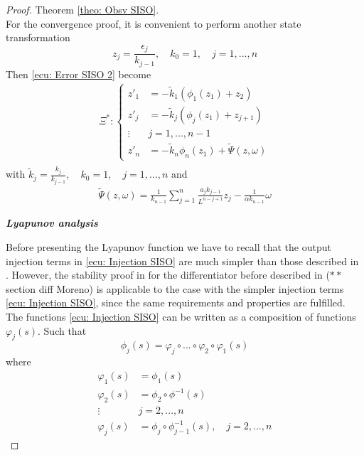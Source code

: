 \documentclass[11pt,letterpaper,twoside,openright]{report}
\begin{document}
\begin{proof}{Theorem \ref{theo: Obsv SISO}. \\}
	For the convergence proof, it is convenient to perform another state transformation
	\begin{equation}
			z_{j} = \frac{\epsilon_{j}}{k_{j-1}},\quad k_0=1,\quad j=1,...,n
	\end{equation}
	Then \eqref{ecu: Error SISO 2} become
	\begin{equation}
		\begin{split}\label{ed2}
			\Xi^*: \left\{
			\begin{array}{rl}
				z'_{1} &= -\tilde{k}_{1}\left( \phi_{1}( z_{1} ) + z_{2} \right)  \\
				z'_{j} &= -\tilde{k}_{j}\left( \phi_{j}( z_{1} ) + z_{j+1} \right)  \\
				\vdots \quad & j=1,...,n-1\\
				z'_{n} &= -\tilde{k}_{n} \phi_{n}( z_{1} ) + \tilde{\Psi}(z,\omega)
			\end{array}
			\right. \\
		\end{split}
	\end{equation}
	with $\tilde{k}_{j}=\frac{k_{j}}{k_{j-1}}, \quad k_{0} = 1, \quad j=1,...,n$ and
	\begin{equation}\label{ecu: tilde Psi}
		\begin{split}
			\tilde{\Psi}(z,\omega) = \frac{1}{k_{n-1}} \sum_{j=1}^{n}  \frac{a_{j}k_{j-1}}{L^{n-j+1}} z_{j} - \frac{1}{\alpha k_{n-1}}\omega
		\end{split} 
	\end{equation}

	\textbf{\textit{Lyapunov analysis}}
	
	Before presenting the Lyapunov function we have to recall that the output injection terms in \eqref{ecu: Injection SISO} are much simpler than those described in \cite{Moreno2021}. However, the stability proof in \cite{Moreno2021} for the differentiator before described in ($**$section diff Moreno) is applicable to the case with the simpler injection terms \eqref{ecu: Injection SISO}, since the same requirements and properties are fulfilled. The functions \eqref{ecu: Injection SISO} can be written as a composition of functions $\varphi_j(s)$. Such that
	\begin{equation}
		\phi_j(s) = \varphi_j \circ ... \circ \varphi_2 \circ \varphi_1(s)
	\end{equation}
	where
	\begin{equation}
		\begin{split}
			\varphi_1(s) &= \phi_1(s) \\
			\varphi_2(s) &= \phi_2 \circ \phi^{-1}(s) \\
			\vdots \quad & j=2,...,n\\
			\varphi_j(s) &= \phi_j\circ\phi^{-1}_{j-1}(s), \quad j=2,...,n
		\end{split}
	\end{equation}
	

\end{proof}
\end{document}
